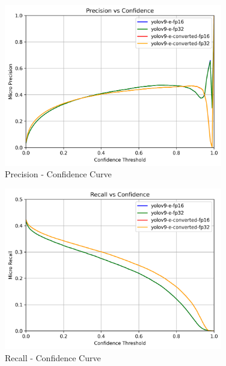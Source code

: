 \documentclass[
]{article}
\begin{document}
\begin{figure}[H]

{\centering \includegraphics[width=3.75in,height=\textheight,keepaspectratio]{../images/precision_confidence_curve.png}

}

\caption{Precision - Confidence Curve}

\end{figure}%

\begin{figure}[H]

{\centering \includegraphics[width=3.75in,height=\textheight,keepaspectratio]{../images/recall_confidence_curve.png}

}

\caption{Recall - Confidence Curve}

\end{figure}%
\end{document}
